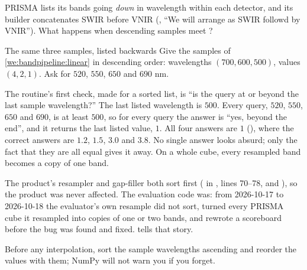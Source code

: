 PRISMA lists its bands going \emph{down} in wavelength within each detector, and its builder
concatenates SWIR before VNIR (, ``We will arrange as SWIR followd
by VNIR''). What happens when descending samples meet ?

\begin{worked}[label={we:bandpipeline:descending}]{The same three samples, listed backwards}
Give  the samples of \cref{we:bandpipeline:linear} in descending order:
wavelengths $(700, 600, 500)$, values $(4, 2, 1)$. Ask for $520$, $550$, $650$ and $690$ nm.

The routine's first check, made for a sorted list, is ``is the query at or beyond the last sample
wavelength?'' The last listed wavelength is $500$. Every query, $520$, $550$, $650$ and $690$, is
at least $500$, so for every query the answer is ``yes, beyond the end'', and it returns the last
listed value, $1$. All four answers are $1$
()\tagC, where the correct answers are
$1.2$, $1.5$, $3.0$ and $3.8$. No single answer looks absurd; only the fact that they are all equal
gives it away. On a whole cube, every resampled band becomes a copy of one band.
\end{worked}

The product's resampler and gap-filler both sort first ( in
, lines 70--78, and ), so the product
was never affected. The evaluation code was: from 2026-10-17 to 2026-10-18 the evaluator's own
resample did not sort, turned every PRISMA cube it resampled into copies of one or two bands, and
rewrote a scoreboard before the bug was found and fixed.  tells that story.

\begin{keypoint}
Before any interpolation, sort the sample wavelengths ascending and reorder the values with them;
NumPy will not warn you if you forget.
\end{keypoint}

